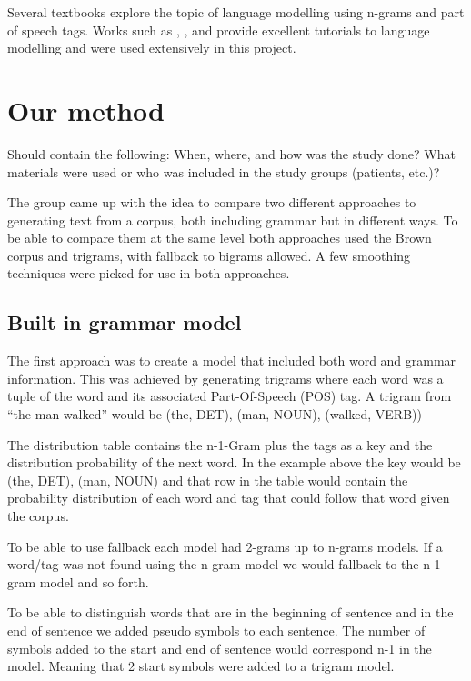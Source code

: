 \documentclass[a4paper,12pt]{article}
\begin{document}
Several textbooks explore the topic of language modelling using n-grams and part of speech tags. Works such as \cite{Jurafsky2000}, \cite{RussellNorvigAIBook3rd}, and \cite{Chen98anempirical} provide excellent tutorials to language modelling and were used extensively in this project.


\section{Our method}
\label{sec:method}

Should contain the following: When, where, and how was the study done? What materials were used or who was included in the study groups (patients, etc.)?


The group came up with the idea to compare two different approaches to generating text from a corpus, both including grammar but in different ways. To be able to compare them at the same level both approaches used the Brown corpus and trigrams, with fallback to bigrams allowed. A few smoothing techniques were picked for use in both approaches.
\subsection{Built in grammar model}
The first approach was to create a model that included both word and grammar information. This was achieved by generating trigrams where each word was a tuple of the word and its associated Part-Of-Speech (POS) tag. A trigram from ``the man walked'' would be (the, DET), (man, NOUN), (walked, VERB))

The distribution table contains the n-1-Gram plus the tags as a key and the distribution probability of the next word. In the example above the key would be (the, DET), (man, NOUN) and that row in the table would contain the probability distribution of each word and tag that could follow that word given the corpus.

To be able to use fallback each model had 2-grams up to n-grams models. If a word/tag was not found using the n-gram model we would fallback to the n-1-gram model and so forth.

To be able to distinguish words that are in the beginning of sentence and in the end of sentence we added pseudo symbols to each sentence. The number of symbols added to the start and end of sentence would correspond n-1 in the model. Meaning that 2 start symbols were added to a trigram model.
\end{document}
